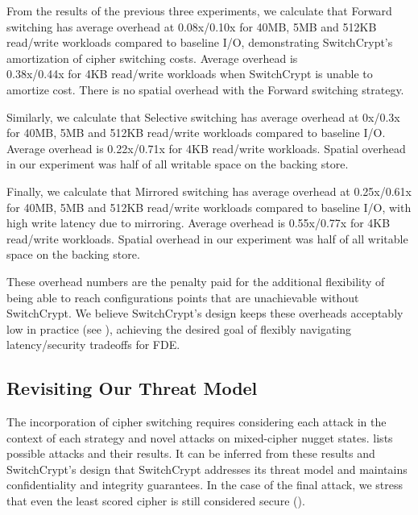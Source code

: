 From the results of the previous three experiments, we calculate that Forward
switching has average overhead at 0.08x/0.10x for 40MB, 5MB and 512KB read/write
workloads compared to baseline I/O, demonstrating SwitchCrypt's amortization of
cipher switching costs. Average overhead is\\0.38x/0.44x for 4KB read/write
workloads when SwitchCrypt is unable to amortize cost. There is no spatial
overhead with the Forward switching strategy.

Similarly, we calculate that Selective switching has average overhead at 0x/0.3x
for 40MB, 5MB and 512KB read/write workloads compared to baseline I/O. Average
overhead is 0.22x/0.71x for 4KB read/write workloads. Spatial overhead in our
experiment was half of all writable space on the backing store.

Finally, we calculate that Mirrored switching has average overhead at
0.25x/0.61x for 40MB, 5MB and 512KB read/write workloads compared to baseline
I/O, with high write latency due to mirroring. Average overhead is 0.55x/0.77x
for 4KB read/write workloads. Spatial overhead in our experiment was half of all
writable space on the backing store.

These overhead numbers are the penalty paid for the additional flexibility of
being able to reach configurations points that are unachievable without
SwitchCrypt. We believe SwitchCrypt's design keeps these overheads acceptably
low in practice (see ), achieving the desired goal of flexibly
navigating latency/security tradeoffs for FDE.

\subsection{Revisiting Our Threat Model} \label{subsec:4}

The incorporation of cipher switching requires considering each attack in the
context of each strategy and novel attacks on mixed-cipher nugget states.
 lists possible attacks and their results. It can be inferred
from these results and SwitchCrypt's design that SwitchCrypt addresses its
threat model and maintains confidentiality and integrity guarantees. In the case
of the final attack, we stress that even the least scored cipher is still
considered secure ().

